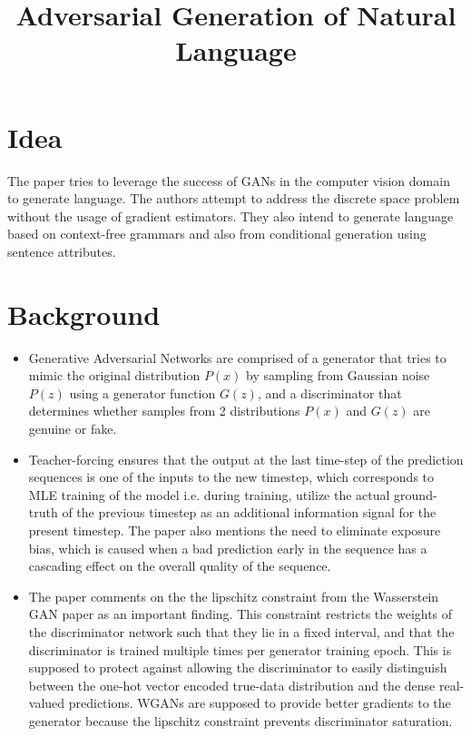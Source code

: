 \documentclass[12pt]{article}
\begin{document}
\title{Adversarial Generation of Natural Language}
\author{}
\date{}
\maketitle

\section{Idea}
  The paper tries to leverage the success of GANs in the computer vision domain to generate language. The authors attempt to address the discrete space problem without the usage of gradient estimators. They also intend to generate language based on context-free grammars and also from conditional generation using sentence attributes.

\section{Background}
  \begin{itemize}
    \item Generative Adversarial Networks \cite{goodfellow2014generative} are comprised of a generator that tries to mimic the original distribution $P(x)$ by sampling from Gaussian noise $P(z)$ using a generator function $G(z)$, and a discriminator that determines whether samples from 2 distributions $P(x)$ and $G(z)$ are genuine or fake.
    \item Teacher-forcing ensures that the output at the last time-step of the prediction sequences is one of the inputs to the new timestep, which corresponds to MLE training of the model i.e. during training, utilize the actual ground-truth of the previous timestep as an additional information signal for the present timestep. The paper also mentions the need to eliminate exposure bias, which is caused when a bad prediction early in the sequence has a cascading effect on the overall quality of the sequence.
    \item The paper comments on the the lipschitz constraint from the Wasserstein GAN \cite{arjovsky2017wasserstein} paper as an important finding. This constraint restricts the weights of the discriminator network such that they lie in a fixed interval, and that the discriminator is trained multiple times per generator training epoch. This is supposed to protect against allowing the discriminator to easily distinguish between the one-hot vector encoded true-data distribution and the dense real-valued predictions. WGANs are supposed to provide better gradients to the generator because the lipschitz constraint prevents discriminator saturation.
  \end{itemize}
\end{document}
